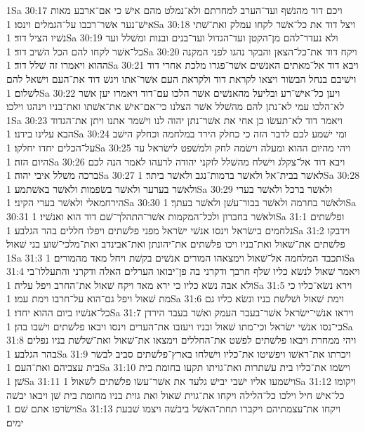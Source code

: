 1Sa 30:17  ויכם דוד מהנשׁף ועד־הערב למחרתם ולא־נמלט מהם אישׁ כי אם־ארבע מאות אישׁ־נער אשׁר־רכבו על־הגמלים וינסו׃
1Sa 30:18  ויצל דוד את כל־אשׁר לקחו עמלק ואת־שׁתי נשׁיו הציל דוד׃
1Sa 30:19  ולא נעדר־להם מן־הקטן ועד־הגדול ועד־בנים ובנות ומשׁלל ועד כל־אשׁר לקחו להם הכל השׁיב דוד׃
1Sa 30:20  ויקח דוד את־כל־הצאן והבקר נהגו לפני המקנה ההוא ויאמרו זה שׁלל דוד׃
1Sa 30:21  ויבא דוד אל־מאתים האנשׁים אשׁר־פגרו מלכת אחרי דוד וישׁיבם בנחל הבשׂור ויצאו לקראת דוד ולקראת העם אשׁר־אתו ויגשׁ דוד את־העם וישׁאל להם לשׁלום׃
1Sa 30:22  ויען כל־אישׁ־רע ובליעל מהאנשׁים אשׁר הלכו עם־דוד ויאמרו יען אשׁר לא־הלכו עמי לא־נתן להם מהשׁלל אשׁר הצלנו כי־אם־אישׁ את־אשׁתו ואת־בניו וינהגו וילכו׃
1Sa 30:23  ויאמר דוד לא־תעשׂו כן אחי את אשׁר־נתן יהוה לנו וישׁמר אתנו ויתן את־הגדוד הבא עלינו בידנו׃
1Sa 30:24  ומי ישׁמע לכם לדבר הזה כי כחלק הירד במלחמה וכחלק הישׁב על־הכלים יחדו יחלקו׃
1Sa 30:25  ויהי מהיום ההוא ומעלה וישׂמה לחק ולמשׁפט לישׂראל עד היום הזה׃
1Sa 30:26  ויבא דוד אל־צקלג וישׁלח מהשׁלל לזקני יהודה לרעהו לאמר הנה לכם ברכה משׁלל איבי יהוה׃
1Sa 30:27  לאשׁר בבית־אל ולאשׁר ברמות־נגב ולאשׁר ביתר׃
1Sa 30:28  ולאשׁר בערער ולאשׁר בשׂפמות ולאשׁר באשׁתמע׃
1Sa 30:29  ולאשׁר ברכל ולאשׁר בערי הירחמאלי ולאשׁר בערי הקיני׃
1Sa 30:30  ולאשׁר בחרמה ולאשׁר בבור־עשׁן ולאשׁר בעתך׃
1Sa 30:31  ולאשׁר בחברון ולכל־המקמות אשׁר־התהלך־שׁם דוד הוא ואנשׁיו׃
1Sa 31:1  ופלשׁתים נלחמים בישׂראל וינסו אנשׁי ישׂראל מפני פלשׁתים ויפלו חללים בהר הגלבע׃
1Sa 31:2  וידבקו פלשׁתים את־שׁאול ואת־בניו ויכו פלשׁתים את־יהונתן ואת־אבינדב ואת־מלכי־שׁוע בני שׁאול׃
1Sa 31:3  ותכבד המלחמה אל־שׁאול וימצאהו המורים אנשׁים בקשׁת ויחל מאד מהמורים׃
1Sa 31:4  ויאמר שׁאול לנשׂא כליו שׁלף חרבך ודקרני בה פן־יבואו הערלים האלה ודקרני והתעללו־בי ולא אבה נשׂא כליו כי ירא מאד ויקח שׁאול את־החרב ויפל עליה׃
1Sa 31:5  וירא נשׂא־כליו כי מת שׁאול ויפל גם־הוא על־חרבו וימת עמו׃
1Sa 31:6  וימת שׁאול ושׁלשׁת בניו ונשׂא כליו גם כל־אנשׁיו ביום ההוא יחדו׃
1Sa 31:7  ויראו אנשׁי־ישׂראל אשׁר־בעבר העמק ואשׁר בעבר הירדן כי־נסו אנשׁי ישׂראל וכי־מתו שׁאול ובניו ויעזבו את־הערים וינסו ויבאו פלשׁתים וישׁבו בהן׃
1Sa 31:8  ויהי ממחרת ויבאו פלשׁתים לפשׁט את־החללים וימצאו את־שׁאול ואת־שׁלשׁת בניו נפלים בהר הגלבע׃
1Sa 31:9  ויכרתו את־ראשׁו ויפשׁיטו את־כליו וישׁלחו בארץ־פלשׁתים סביב לבשׂר בית עצביהם ואת־העם׃
1Sa 31:10  וישׂמו את־כליו בית עשׁתרות ואת־גויתו תקעו בחומת בית שׁן׃
1Sa 31:11  וישׁמעו אליו ישׁבי יבישׁ גלעד את אשׁר־עשׂו פלשׁתים לשׁאול׃
1Sa 31:12  ויקומו כל־אישׁ חיל וילכו כל־הלילה ויקחו את־גוית שׁאול ואת גוית בניו מחומת בית שׁן ויבאו יבשׁה וישׂרפו אתם שׁם׃
1Sa 31:13  ויקחו את־עצמתיהם ויקברו תחת־האשׁל ביבשׁה ויצמו שׁבעת ימים׃


